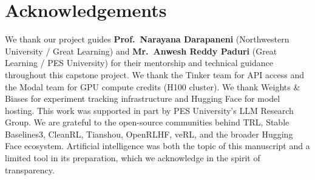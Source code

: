 \documentclass[a4paper,10pt]{article}
\begin{document}
\section*{Acknowledgements}
We thank our project guides \textbf{Prof.~Narayana Darapaneni}
(Northwestern University / Great Learning) and
\textbf{Mr.~Anwesh Reddy Paduri} (Great Learning / PES University)
for their mentorship and technical guidance throughout this capstone project.
We thank the Tinker team for API access and the Modal team for GPU compute credits
(H100 cluster). We thank Weights \& Biases for experiment tracking infrastructure
and Hugging Face for model hosting. This work was supported in part by PES
University's LLM Research Group. We are grateful to the open-source communities
behind TRL, Stable Baselines3, CleanRL, Tianshou, OpenRLHF, veRL, and the
broader Hugging Face ecosystem. Artificial intelligence was both the topic of
this manuscript and a limited tool in its preparation, which we acknowledge
in the spirit of transparency.



\appendix

\end{document}
